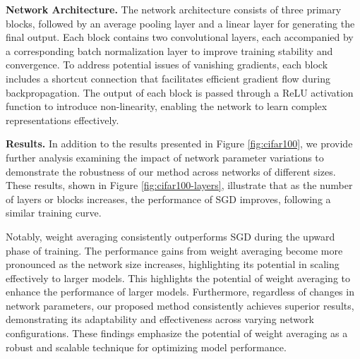 \textbf{Network Architecture.} The network architecture consists of three primary blocks, followed by an average pooling layer and a linear layer for generating the final output. Each block contains two convolutional layers, each accompanied by a corresponding batch normalization layer to improve training stability and convergence. To address potential issues of vanishing gradients, each block includes a shortcut connection that facilitates efficient gradient flow during backpropagation. The output of each block is passed through a ReLU activation function to introduce non-linearity, enabling the network to learn complex representations effectively.

\textbf{Results.} In addition to the results presented in Figure \ref{fig:cifar100}, we provide further analysis examining the impact of network parameter variations to demonstrate the robustness of our method across networks of different sizes. These results, shown in Figure \ref{fig:cifar100-layers}, illustrate that as the number of layers or blocks increases, the performance of SGD improves, following a similar training curve.

Notably, weight averaging consistently outperforms SGD during the upward phase of training. The performance gains from weight averaging become more pronounced as the network size increases, highlighting its potential in scaling effectively to larger models. This highlights the potential of weight averaging to enhance the performance of larger models. 
%
Furthermore, regardless of changes in network parameters, our proposed method consistently achieves superior results, demonstrating its adaptability and effectiveness across varying network configurations. These findings emphasize the potential of weight averaging as a robust and scalable technique for optimizing model performance.


